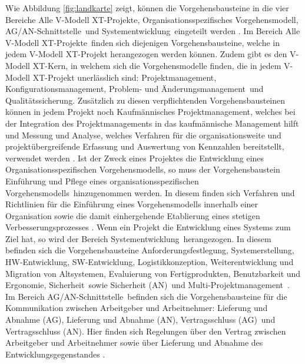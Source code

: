  Wie Abbildung \ref{fig:landkarte} zeigt, können die Vorgehensbausteine in die vier Bereiche \grqq Alle V-Modell XT-Projekte\grqq, \grqq Organisationsspezifisches Vorgehensmodell\grqq, \grqq AG/AN-Schnittstelle\grqq \ und \grqq Systementwicklung\grqq \  eingeteilt werden \cite{2004vmodell}.\newline
 Im Bereich \grqq Alle V-Modell XT-Projekte\grqq \ finden sich diejenigen Vorgehensbausteine, welche in jedem V-Modell XT-Projekt herangezogen werden können. Zudem gibt es den V-Modell XT-Kern, in welchem sich die Vorgehensmodelle finden, die in jedem V-Modell XT-Projekt unerlässlich sind: \grqq Projektmanagement\grqq, \grqq Konfigurationsmanagement\grqq, \grqq Problem- und Änderungsmanagement\grqq \ und \grqq Qualitätssicherung\grqq. Zusätzlich zu diesen verpflichtenden Vorgehensbausteinen können in jedem Projekt noch \grqq Kaufmännisches Projektmanagement\grqq, welches bei der Integration des Projektmanagements in das kaufmännische Management hilft und \grqq Messung und Analyse\grqq, welches Verfahren für die organisationsweite und projektübergreifende Erfassung und Auswertung von Kennzahlen bereitstellt, verwendet werden \cite{2004vmodell}.\newline
 Ist der Zweck eines Projektes die Entwicklung eines \grqq Organisationsspezifischen Vorgehensmodells\grqq, so muss der Vorgehensbaustein \grqq Einführung und Pflege eines organisationsspezifischen Vorgehensmodells\grqq \ hinzugenommen werden. In diesem finden sich Verfahren und Richtlinien für die Einführung eines Vorgehensmodells innerhalb einer Organisation sowie die damit einhergehende Etablierung eines stetigen Verbesserungsprozesses \cite{2004vmodell}.\newline
 Wenn ein Projekt die Entwicklung eines Systems zum Ziel hat, so wird der Bereich \grqq Systementwicklung\grqq \ herangezogen. In diesem befinden sich die Vorgehensbausteine \grqq Anforderungsfestlegung\grqq, \grqq Systemerstellung\grqq, \grqq HW-Entwicklung\grqq, \grqq SW-Entwicklung\grqq, \grqq Logistikkonzeption\grqq, \grqq Weiterentwicklung und Migration von Altsystemen\grqq, \grqq Evaluierung von Fertigprodukten\grqq, \grqq Benutzbarkeit und Ergonomie\grqq, \grqq Sicherheit\grqq \ sowie \grqq Sicherheit (AN)\grqq \ und \grqq Multi-Projektmanagement\grqq \ \cite{2004vmodell}. \newline
 Im Bereich \grqq AG/AN-Schnittstelle\grqq \ befinden sich die Vorgehensbausteine für die Kommunikation zwischen Arbeitgeber und Arbeitnehmer: \grqq Lieferung und Abnahme (AG)\grqq, \grqq Lieferung und Abnahme (AN)\grqq, \grqq Vertragsschluss (AG)\grqq \ und \grqq Vertragsschluss (AN)\grqq. Hier finden sich Regelungen über den Vertrag zwischen Arbeitgeber und Arbeitnehmer sowie über Lieferung und Abnahme des Entwicklungsgegenstandes \cite{2004vmodell}. \newline
 
